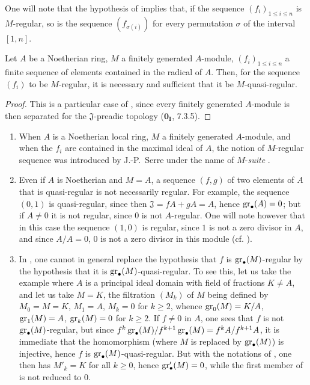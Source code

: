 One will note that the hypothesis of  implies that, if the sequence $(f_i)_{1\leq i\leq n}$ is $M$-regular, so is the sequence $(f_{\sigma(i)})$ for every permutation $\sigma$ of the interval $[1,n]$.

\begin{corollary}[15.1.11]
\label{0.15.1.11}
Let $A$ be a Noetherian ring, $M$ a finitely generated $A$-module, $(f_i)_{1\leq i\leq n}$ a finite sequence of elements contained in the radical of $A$.
Then, for the sequence $(f_i)$ to be $M$-regular, it is necessary and sufficient that it be $M$-quasi-regular.
\end{corollary}

\begin{proof}
This is a particular case of , since every finitely generated $A$-module is then separated for the $\mathfrak{J}$-preadic topology ($\mathbf{0_I}$, 7.3.5).
\end{proof}

\begin{remarks}[15.1.12]
\label{0.15.1.12}
\mbox{}
\begin{enumerate}
  \item[(i)] When $A$ is a Noetherian local ring, $M$ a finitely generated $A$-module, and when the $f_i$ are contained in the maximal ideal of $A$, the notion of $M$-regular sequence was introduced by J.-P.~Serre under the name of $M$-\emph{suite} \cite{I-17}.
  \item[(ii)] Even if $A$ is Noetherian and $M=A$, a sequence $(f,g)$ of two elements of $A$ that is quasi-regular is not necessarily regular.
  For example, the sequence $(0,1)$ is quasi-regular, since then $\mathfrak{J}=fA+gA=A$, hence $\operatorname{gr}_\bullet(A)=0$;
  but if $A\neq 0$ it is not regular, since $0$ is not $A$-regular.
  One will note however that in this case the sequence $(1,0)$ is regular, since $1$ is not a zero divisor in $A$, and since $A/A=0$, $0$ is not a zero divisor in this module (cf. ).
  \item[(iii)]
  In , one cannot in general replace the hypothesis that $f$ is $\operatorname{gr}_\bullet(M)$-regular by the hypothesis that it is $\operatorname{gr}_\bullet(M)$-quasi-regular.
  To see this, let us take the example  where $A$ is a principal ideal domain with field of fractions $K\neq A$, and let us take $M=K$, the filtration $(M_k)$ of $M$ being defined by $M_0=M=K$, $M_1=A$, $M_k=0$ for $k\geq 2$, whence $\operatorname{gr}_0(M)=K/A$, $\operatorname{gr}_1(M)=A$, $\operatorname{gr}_k(M)=0$ for $k\geq 2$.
  If $f\neq 0$ in $A$, one sees that $f$ is not $\operatorname{gr}_\bullet(M)$-regular, but since $f^k\operatorname{gr}_\bullet(M)/f^{k+1}\operatorname{gr}_\bullet(M)=f^kA/f^{k+1}A$, it is immediate that the homomorphism  (where $M$ is replaced by $\operatorname{gr}_\bullet(M)$) is injective, hence $f$ is $\operatorname{gr}_\bullet(M)$-quasi-regular.
  But with the notations of , one then has $M'_k=K$ for all $k\geq 0$, hence $\operatorname{gr}'_\bullet(M)=0$, while the first member of  is not reduced to $0$.
\end{enumerate}
\end{remarks}

